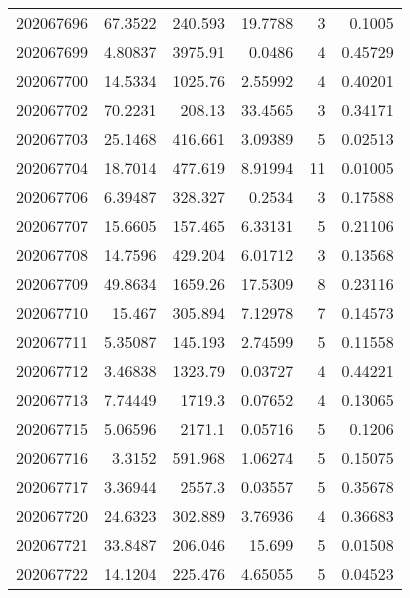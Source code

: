 \begin{tabular}{rrrrrr}
 202067696 &         67.3522  &      240.593  &           19.7788  &           3 & 0.1005  \\
 202067699 &          4.80837 &     3975.91   &            0.0486  &           4 & 0.45729 \\
 202067700 &         14.5334  &     1025.76   &            2.55992 &           4 & 0.40201 \\
 202067702 &         70.2231  &      208.13   &           33.4565  &           3 & 0.34171 \\
 202067703 &         25.1468  &      416.661  &            3.09389 &           5 & 0.02513 \\
 202067704 &         18.7014  &      477.619  &            8.91994 &          11 & 0.01005 \\
 202067706 &          6.39487 &      328.327  &            0.2534  &           3 & 0.17588 \\
 202067707 &         15.6605  &      157.465  &            6.33131 &           5 & 0.21106 \\
 202067708 &         14.7596  &      429.204  &            6.01712 &           3 & 0.13568 \\
 202067709 &         49.8634  &     1659.26   &           17.5309  &           8 & 0.23116 \\
 202067710 &         15.467   &      305.894  &            7.12978 &           7 & 0.14573 \\
 202067711 &          5.35087 &      145.193  &            2.74599 &           5 & 0.11558 \\
 202067712 &          3.46838 &     1323.79   &            0.03727 &           4 & 0.44221 \\
 202067713 &          7.74449 &     1719.3    &            0.07652 &           4 & 0.13065 \\
 202067715 &          5.06596 &     2171.1    &            0.05716 &           5 & 0.1206  \\
 202067716 &          3.3152  &      591.968  &            1.06274 &           5 & 0.15075 \\
 202067717 &          3.36944 &     2557.3    &            0.03557 &           5 & 0.35678 \\
 202067720 &         24.6323  &      302.889  &            3.76936 &           4 & 0.36683 \\
 202067721 &         33.8487  &      206.046  &           15.699   &           5 & 0.01508 \\
 202067722 &         14.1204  &      225.476  &            4.65055 &           5 & 0.04523 \\

\end{tabular}
